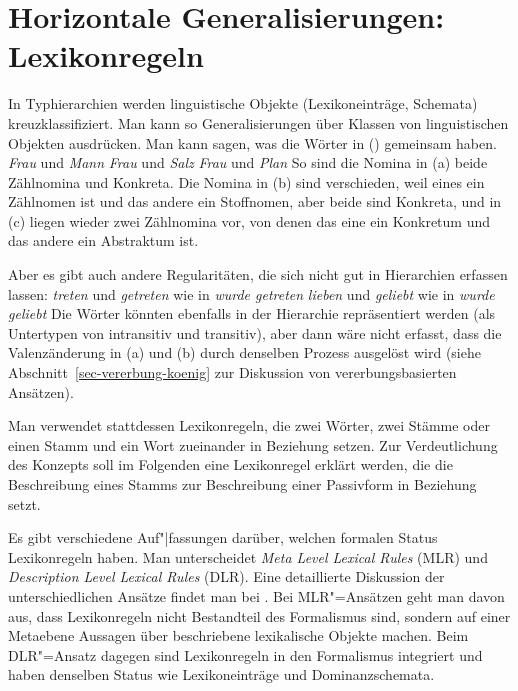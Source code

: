 \section{Horizontale Generalisierungen: Lexikonregeln}
\label{sec-lr}\label{Abschnitt-Lexikonregeln}


In Typhierarchien werden linguistische Objekte (Lexikoneinträge, Schemata)
kreuzklassifiziert. Man kann so Generalisierungen über Klassen von linguistischen Objekten ausdrücken.
Man kann \zb sagen, was die Wörter in () gemeinsam haben.
\eal
\ex \emph{Frau} und \emph{Mann}
\ex \emph{Frau} und \emph{Salz}
\ex \emph{Frau} und \emph{Plan}
\zl
So sind die Nomina in (a) beide Zählnomina und Konkreta. Die Nomina in (b) sind verschieden,
weil eines ein Zählnomen ist und das andere ein Stoffnomen, aber beide sind Konkreta, und in (c)
liegen wieder zwei Zählnomina vor, von denen das eine ein Konkretum und das andere ein Abstraktum ist.

Aber es gibt auch andere Regularitäten, die sich nicht gut in Hierarchien erfassen lassen:
\eal
\ex \emph{treten} und \emph{getreten} wie in \emph{wurde getreten}
\ex \emph{lieben} und \emph{geliebt}  wie in \emph{wurde geliebt}
\zl
Die Wörter könnten ebenfalls in der Hierarchie repräsentiert werden (als Untertypen von intransitiv und transitiv),
aber dann wäre nicht erfasst, dass die Valenzänderung in (a) und (b) durch denselben Prozess
ausgelöst wird (siehe Abschnitt~\ref{sec-vererbung-koenig} zur Diskussion von vererbungsbasierten Ansätzen).

Man verwendet stattdessen Lexikonregeln, die zwei Wörter, zwei Stämme oder einen Stamm und ein
Wort zueinander in Beziehung setzen. 
Zur Verdeutlichung des Konzepts soll im Folgenden eine Lexikonregel erklärt werden,
die die Beschreibung eines Stamms zur Beschreibung einer Passivform in Beziehung setzt.

Es gibt verschiedene Auf"|fassungen darüber, welchen formalen Status Lexikonregeln haben.
Man unterscheidet \emph{Meta Level Lexical Rules} (MLR) und \emph{Description Level Lexical Rules} (DLR).
Eine detaillierte Diskussion der unterschiedlichen Ansätze findet man bei .
Bei MLR"=Ansätzen geht man davon aus, dass Lexikonregeln nicht Bestandteil des Formalismus sind,
sondern auf einer Metaebene Aussagen über beschriebene lexikalische Objekte machen. Beim
DLR"=Ansatz dagegen sind Lexikonregeln in den Formalismus integriert und haben denselben
Status wie Lexikoneinträge und Dominanzschemata.




